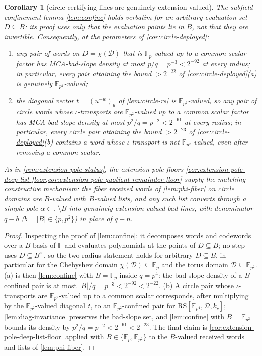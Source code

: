 \documentclass[11pt]{article}
\newtheorem{corollary}[corollary]{Corollary}
\theoremstyle{definition}
\theoremstyle{remark}
\newcommand{\F}{\mathbb{F}}
\newcommand{\B}{B}
\newcommand{\RS}{\mathrm{RS}}
\begin{document}
\begin{corollary}[circle certifying lines are genuinely extension-valued]\label{cor:circle-Fvalued}
The subfield-confinement lemma \cref{lem:confine} holds verbatim for an arbitrary evaluation set $D\subseteq\B$: its proof uses only that the evaluation points lie in $\B$, not that they are invertible. Consequently, at the parameters of \cref{cor:circle-deployed}:
\begin{enumerate}[label=\textup{(\alph*)}]
\item any pair of words on $D=\chi(\mathcal D)$ that is $\F_p$-valued up to a common scalar factor has MCA-bad-slope density at most $p/q=p^{-3}<2^{-92}$ at every radius; in particular, every pair attaining the bound $>2^{-22}$ of \cref{cor:circle-deployed}\textup{(a)} is genuinely $\F_{p^4}$-valued;
\item the diagonal vector $t=(u^{-w})_{u}$ of \cref{lem:circle-rs} is $\F_{p^2}$-valued, so any pair of circle words whose $\iota$-transports are $\F_{p^2}$-valued up to a common scalar factor has MCA-bad-slope density at most $p^2/q=p^{-2}<2^{-61}$ at every radius; in particular, every circle pair attaining the bound $>2^{-23}$ of \cref{cor:circle-deployed}\textup{(b)} contains a word whose $\iota$-transport is not $\F_{p^2}$-valued, even after removing a common scalar.
\end{enumerate}
As in \cref{rem:extension-pole-status}, the extension-pole floors \cref{cor:extension-pole-deep-list-floor,cor:extension-pole-quotient-remainder-floor} supply the matching constructive mechanism: the fiber received words of \cref{lem:phi-fiber} on circle domains are $\B$-valued with $\B$-valued lists, and any such list converts through a simple pole $\alpha\in\F\setminus\B$ into genuinely extension-valued bad lines, with denominator $q-b$ ($b=|\B|\in\{p,p^2\}$) in place of $q-n$.
\end{corollary}

\begin{proof}
Inspecting the proof of \cref{lem:confine}: it decomposes words and codewords over a $\B$-basis of $\F$ and evaluates polynomials at the points of $D\subseteq\B$; no step uses $D\subseteq\B^{\times}$, so the two-radius statement holds for arbitrary $D\subseteq\B$, in particular for the Chebyshev domain $\chi(\mathcal D)\subseteq\F_p$ and the torus domain $\mathcal D\subseteq\F_{p^2}$. (a) is then \cref{lem:confine} with $\B=\F_p$ inside $q=p^4$: the bad-slope density of a $\B$-confined pair is at most $|\B|/q=p^{-3}<2^{-92}<2^{-22}$. (b) A circle pair whose $\iota$-transports are $\F_{p^2}$-valued up to a common scalar corresponds, after multiplying by the $\F_{p^2}$-valued diagonal $t$, to an $\F_{p^2}$-confined pair for $\RS[\F_{p^4},\mathcal D,k_c]$; \cref{lem:diag-invariance} preserves the bad-slope set, and \cref{lem:confine} with $\B=\F_{p^2}$ bounds its density by $p^2/q=p^{-2}<2^{-61}<2^{-23}$. The final claim is \cref{cor:extension-pole-deep-list-floor} applied with $\B\in\{\F_p,\F_{p^2}\}$ to the $\B$-valued received words and lists of \cref{lem:phi-fiber}.
\end{proof}
\end{document}
